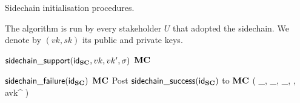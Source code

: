 \begin{algorithm}[H]
  \caption{\label{alg.init}Sidechain initialisation procedures.}
  \smallskip
  The algorithm is run by every stakeholder $U$ that adopted the sidechain. We
  denote by $(vk,sk)$ its public and private keys.
  \smallskip
  \begin{algorithmic}[1]
    \On{$\SidechainAdoption(\idSC)$}
      \Let{\scstate[\idSC]}{\initializing}
      \Post
        {$\mathsf{sidechain\_support}(\mathsf{id}_{\mathbf{SC}},vk,vk',\sigma)$}
        {$\mathbf{MC}$}
    \EndOn

      \If{$\scstate[\idSC]=\initializing$}
        \If{$\ActFail()$}
          \Let{\scstate[\idSC]}{\failed}
          \Post
            {$\mathsf{sidechain\_failure}(\mathsf{id}_{\mathbf{SC}})$}
            {$\mathbf{MC}$}
        \ElsIf{$\ActSuccess()$}
          \Let{\scstate[\idSC]}{\initialized}
          \Let{\jstart}{\ActEpoch()}
          \State Post $\mathsf{sidechain\_success}(\mathsf{id}_{\mathbf{SC}})$ to $\mathbf{MC}$
        \EndIf
      \EndIf
        \Let{\Genesisb}
          {\left(
            \id_\Sidechain,
            \SDb_{\jstart},
            \rndb_{\jstart},
            \params,
            avk^{\jstart}
          \right)}
        \Let{\ChainSC}{(\Genesisb)}
      \EndIf
    \EndOn
  \end{algorithmic}
\end{algorithm}
